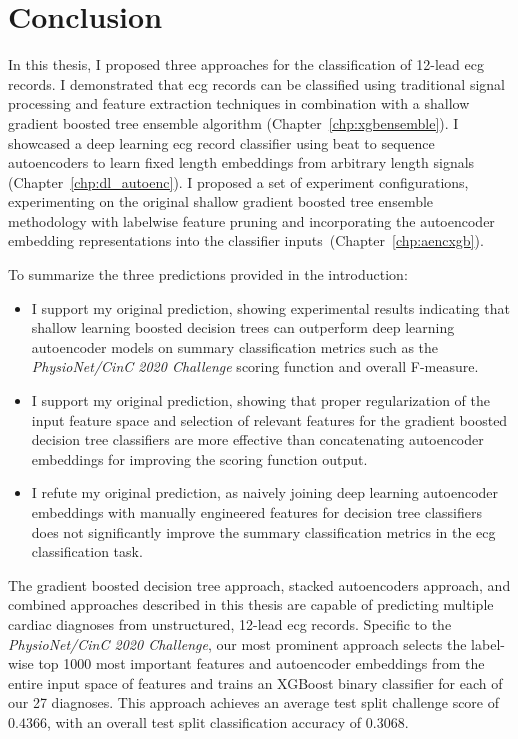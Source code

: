 \documentclass[\main/thesis.tex]{subfiles}
\begin{document}
\chapter{Conclusion}
\label{chp:conclusion}

In this thesis, I proposed three approaches for the classification of 12-lead \gls{ecg} records.
I demonstrated that \gls{ecg} records can be classified using traditional signal processing and feature extraction techniques in combination with a shallow gradient boosted tree ensemble algorithm (Chapter~\ref{chp:xgbensemble}).
I showcased a deep learning \gls{ecg} record classifier using beat to sequence autoencoders to learn fixed length embeddings from arbitrary length signals (Chapter~\ref{chp:dl_autoenc}).
I proposed a set of experiment configurations, experimenting on the original shallow gradient boosted tree ensemble methodology with labelwise feature pruning and incorporating the autoencoder embedding representations into the classifier inputs~(Chapter~\ref{chp:aencxgb}).

To summarize the three predictions provided in the introduction:
\begin{itemize}
    \item I support my original prediction, showing experimental results indicating that shallow learning boosted decision trees can outperform deep learning autoencoder models on summary classification metrics such as the \emph{PhysioNet/CinC 2020 Challenge} scoring function and overall F-measure.
    \item I support my original prediction, showing that proper regularization of the input feature space and selection of relevant features for the gradient boosted decision tree classifiers are more effective than concatenating autoencoder embeddings for improving the scoring function output.
    \item I refute my original prediction, as naively joining deep learning autoencoder embeddings with manually engineered features for decision tree classifiers does not significantly improve the summary classification metrics in the \gls{ecg} classification task.
\end{itemize}

The gradient boosted decision tree approach, stacked autoencoders approach, and combined approaches described in this thesis are capable of predicting multiple cardiac diagnoses from unstructured, 12-lead \gls{ecg} records.
Specific to the \emph{PhysioNet/CinC 2020 Challenge}, our most prominent approach selects the label-wise top 1000 most important features and autoencoder embeddings from the entire input space of features and trains an XGBoost binary classifier for each of our 27 diagnoses.
This approach achieves an average test split challenge score of $0.4366$, with an overall test split classification accuracy of $0.3068$.
\end{document}
